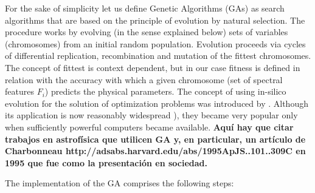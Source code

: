 {{%

For the sake of simplicity let us define Genetic Algorithms (GAs) as
search algorithms that are based on the principle of evolution by
natural selection. The procedure works by evolving (in the sense
explained below) sets of variables (chromosomes) from an initial
random population. Evolution proceeds via cycles of differential
replication, recombination and mutation of the fittest
chromosomes. The concept of fittest is context dependent, but in our
case fitness is defined in relation with the accuracy with which a
given chromosome (set of spectral features ${F_i}$) predicts the
physical parameters. The concept of using in-silico evolution for the
solution of optimization problems was introduced
by \cite{holland1975adaptation}. Although its application is now
reasonably widespread \citep[see e.g. ]{goldberg1989genetic}), they
became very popular only when sufficiently powerful computers became
available. {\bf Aquí hay que citar trabajos en astrofísica que
utilicen GA y, en particular, un artículo de Charbonneau
http://adsabs.harvard.edu/abs/1995ApJS..101..309C en 1995 que fue como
la presentación en sociedad.}

The implementation of the GA comprises the following steps:

}}
